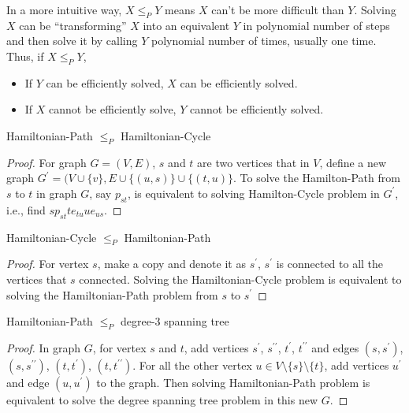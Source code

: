 					In a more intuitive way, $X \le_P Y$ means $X$ can't be more difficult than $Y$. Solving $X$ can be ``transforming'' $X$ into an equivalent $Y$ in polynomial number of steps and then solve it by calling $Y$ polynomial number of times, usually one time. Thus, if $X \le_P Y$,
					\begin{itemize}
						\item If $Y$ can be efficiently solved, $X$ can be efficiently solved.
						\item If $X$ cannot be efficiently solve, $Y$ cannot be efficiently solved.
					\end{itemize}


					\begin{lemma}
						Hamiltonian-Path $\le_P$ Hamiltonian-Cycle
					\end{lemma}
					\begin{proof}
						For graph $G = (V, E)$, $s$ and $t$ are two vertices that in $V$, define a new graph $G^\prime = (V \cup \{v\}, E \cup \{(u, s)\} \cup \{(t, u)\}$. To solve the Hamilton-Path from $s$ to $t$ in graph $G$, say $p_{st}$, is equivalent to solving Hamilton-Cycle problem in $G^\prime$, i.e., find $sp_{st}te_{tu}ue_{us}$.
					\end{proof}

					\begin{lemma}
						Hamiltonian-Cycle $\le_P$ Hamiltonian-Path
					\end{lemma}

					\begin{proof}
						For vertex $s$, make a copy and denote it as $s^\prime$, $s^\prime$ is connected to all the vertices that $s$ connected. Solving the Hamiltonian-Cycle problem is equivalent to solving the Hamiltonian-Path problem from $s$ to $s^\prime$
					\end{proof}

					\begin{lemma}
						Hamiltonian-Path $\le_P$ degree-3 spanning tree
					\end{lemma}

					\begin{proof}
						In graph $G$, for vertex $s$ and $t$, add vertices $s^\prime$, $s^{\prime\prime}$, $t^\prime$, $t^{\prime\prime}$ and edges $(s, s^\prime)$, $(s, s^{\prime\prime})$, $(t, t^\prime)$, $(t, t^{\prime\prime})$. For all the other vertex $u \in V\setminus \{s\} \setminus \{t\}$, add vertices $u^\prime$ and edge $(u, u^\prime)$ to the graph. Then solving Hamiltonian-Path problem is equivalent to solve the degree spanning tree problem in this new $G$.
					\end{proof}

